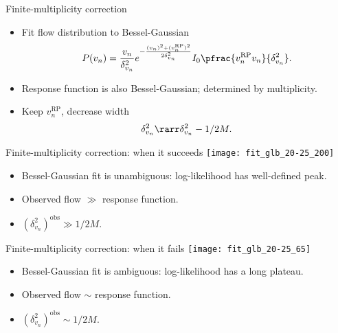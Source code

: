 \documentclass{beamer}
\begin{document}
\begin{frame}{Finite-multiplicity correction}
  \vspace{1em}

  \begin{itemize}
    \item Fit flow distribution to Bessel-Gaussian
      \begin{equation*}
        P(v_n) = \frac{v_n}{\delta_{v_n}^2} e^{ -\frac{(v_n)^2 + (v_n^\text{RP})^2}{2\delta_{v_n}^2} }
          I_0 \pfrac{v_n^\text{RP}v_n}{\delta_{v_n}^2}.
      \end{equation*}
    \item Response function is also Bessel-Gaussian; determined by multiplicity.
    \item Keep $v_n^\text{RP}$, decrease width
      \begin{equation*}
        \delta_{v_n}^2 \rarr \delta_{v_n}^2 - 1/2M.
      \end{equation*}
  \end{itemize}
\end{frame}


\begin{frame}{Finite-multiplicity correction:  when it succeeds}
  \texttt{[image: fit\_glb\_20-25\_200]}

  \begin{itemize}
    \item Bessel-Gaussian fit is unambiguous:  log-likelihood has well-defined peak.
    \item Observed flow $\gg$ response function.
    \item $(\delta_{v_n}^2)^\text{obs} \gg 1/2M$.
  \end{itemize}
\end{frame}


\begin{frame}{Finite-multiplicity correction:  when it fails}
  \texttt{[image: fit\_glb\_20-25\_65]}

  \begin{itemize}
    \item Bessel-Gaussian fit is ambiguous:  log-likelihood has a long plateau.
    \item Observed flow $\sim$ response function.
    \item $(\delta_{v_n}^2)^\text{obs} \sim 1/2M$.
  \end{itemize}
\end{frame}
\end{document}
